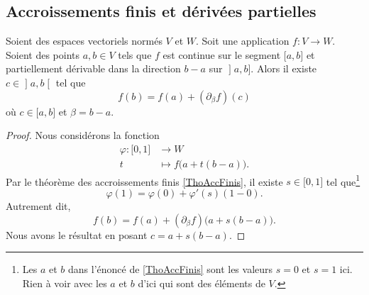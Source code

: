 \subsection{Accroissements finis et dérivées partielles}

\begin{proposition}     \label{PROPooCAWBooINcNxj}
	Soient des espaces vectoriels normés \( V\) et \( W\). Soit une application \( f\colon V\to W\). Soient des points \( a,b\in V\) tels que \( f\) est continue sur le segment \( \mathopen[ a , b \mathclose]\) et partiellement dérivable dans la direction \( b-a\) sur \( \mathopen] a , b \mathclose]\). Alors il existe \( c\in\mathopen] a , b \mathclose[\) tel que
	\begin{equation}
		f(b)=f(a)+(\partial_{\beta}f)(c)
	\end{equation}
	où \( c\in \mathopen[ a , b \mathclose]\) et \( \beta=b-a\).
\end{proposition}

\begin{proof}
	Nous considérons la fonction
	\begin{equation}
		\begin{aligned}
			\varphi\colon \mathopen[ 0 , 1 \mathclose] & \to W                          \\
			t                                          & \mapsto f\big( a+t(b-a) \big).
		\end{aligned}
	\end{equation}
	Par le théorème des accroissements finis \ref{ThoAccFinis}, il existe \( s\in \mathopen[ 0 , 1 \mathclose]\) tel que\footnote{Les \( a\) et \( b\) dans l'énoncé de \ref{ThoAccFinis} sont les valeurs \( s=0\) et \( s=1\) ici. Rien à voir avec les \( a\) et \( b\) d'ici qui sont des éléments de \( V\).}
	\begin{equation}
		\varphi(1)=\varphi(0)+\varphi'(s)(1-0).
	\end{equation}
	Autrement dit,
	\begin{equation}
		f(b)=f(a)+(\partial_{\beta}f)\big( a+s(b-a) \big).
	\end{equation}
	Nous avons le résultat en posant \( c=a+s(b-a)\).
\end{proof}

